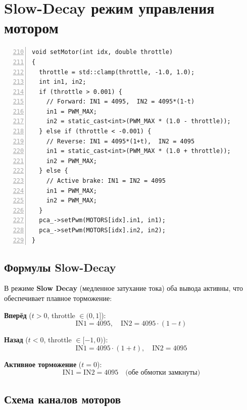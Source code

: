 \section{Slow-Decay режим управления мотором}

\begin{filebox}[title={\filepath{motor\_node.cpp}, строки 210--232 --- setMotor()}]
\begin{lstlisting}[style=cppstyle, numbers=left, firstnumber=210]
void setMotor(int idx, double throttle)
{
  throttle = std::clamp(throttle, -1.0, 1.0);
  int in1, in2;
  if (throttle > 0.001) {
    // Forward: IN1 = 4095,  IN2 = 4095*(1-t)
    in1 = PWM_MAX;
    in2 = static_cast<int>(PWM_MAX * (1.0 - throttle));
  } else if (throttle < -0.001) {
    // Reverse: IN1 = 4095*(1+t),  IN2 = 4095
    in1 = static_cast<int>(PWM_MAX * (1.0 + throttle));
    in2 = PWM_MAX;
  } else {
    // Active brake: IN1 = IN2 = 4095
    in1 = PWM_MAX;
    in2 = PWM_MAX;
  }
  pca_->setPwm(MOTORS[idx].in1, in1);
  pca_->setPwm(MOTORS[idx].in2, in2);
}
\end{lstlisting}
\end{filebox}

\subsection{Формулы Slow-Decay}

В режиме \textbf{Slow Decay} (медленное затухание тока) оба вывода
активны, что обеспечивает плавное торможение:

\textbf{Вперёд} ($t > 0$, throttle $\in (0, 1]$):
\begin{equation}
  \text{IN1} = 4095, \quad \text{IN2} = 4095 \cdot (1 - t)
  \label{eq:forward_pwm}
\end{equation}

\textbf{Назад} ($t < 0$, throttle $\in [-1, 0)$):
\begin{equation}
  \text{IN1} = 4095 \cdot (1 + t), \quad \text{IN2} = 4095
  \label{eq:reverse_pwm}
\end{equation}

\textbf{Активное торможение} ($t = 0$):
\begin{equation}
  \text{IN1} = \text{IN2} = 4095 \quad \text{(обе обмотки замкнуты)}
  \label{eq:brake_pwm}
\end{equation}

\subsection{Схема каналов моторов}

